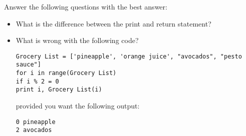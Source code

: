 \begin{problem}
Answer the following questions with the best answer:
\begin{itemize}
\item What is the difference between the print and return statement?
\item What is wrong with the following code?
\begin{lstlisting}
Grocery List = ['pineapple', 'orange juice', "avocados", "pesto sauce"]
for i in range(Grocery List)
if i % 2 = 0
print i, Grocery List(i)
\end{lstlisting}
provided you want the following output:
\begin{lstlisting}
0 pineapple
2 avocados
\end{lstlisting}
\end{itemize}
\end{problem}


